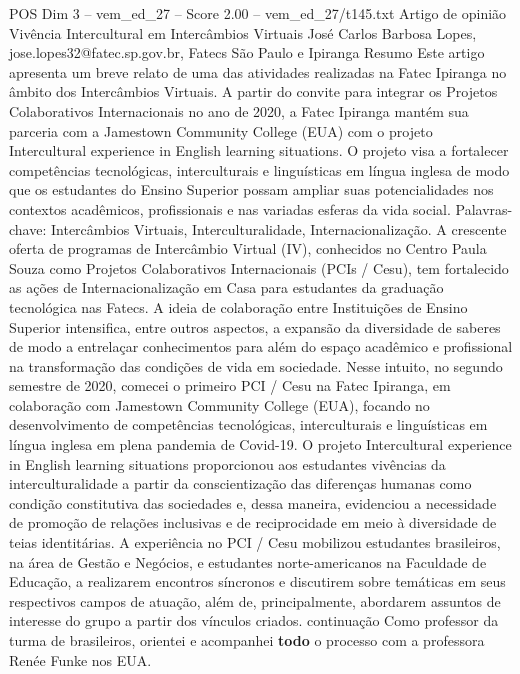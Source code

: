 \begin{textsample}{POS Dim 3 – vem\_ed\_27 – Score 2.00 – vem\_ed\_27/t145.txt}  \label{ex:f3_pos_019}
Artigo de opinião Vivência Intercultural em Intercâmbios Virtuais José Carlos Barbosa Lopes, jose.lopes32@fatec.sp.gov.br, Fatecs São Paulo e Ipiranga Resumo Este artigo apresenta um breve relato de uma das atividades realizadas na Fatec Ipiranga no âmbito dos Intercâmbios Virtuais.
A partir do convite para integrar os Projetos Colaborativos Internacionais no ano de 2020, a Fatec Ipiranga mantém sua parceria com a Jamestown Community College (EUA) com o projeto Intercultural experience in English learning situations.
O projeto visa a fortalecer competências tecnológicas, interculturais e linguísticas em língua inglesa de modo que os estudantes do Ensino Superior possam ampliar suas potencialidades nos contextos acadêmicos, profissionais e nas variadas esferas da vida social.
Palavras-chave: Intercâmbios Virtuais, Interculturalidade, Internacionalização.
A crescente oferta de programas de Intercâmbio Virtual (IV), conhecidos no Centro Paula Souza como Projetos Colaborativos Internacionais (PCIs / Cesu), tem fortalecido as ações de Internacionalização em Casa para estudantes da graduação tecnológica nas Fatecs.
A ideia de colaboração entre Instituições de Ensino Superior intensifica, entre outros aspectos, a expansão da diversidade de saberes de modo a entrelaçar conhecimentos para além do espaço acadêmico e profissional na transformação das condições de vida em sociedade.
Nesse intuito, no segundo semestre de 2020, comecei o primeiro PCI / Cesu na Fatec Ipiranga, em colaboração com Jamestown Community College (EUA), focando no desenvolvimento de competências tecnológicas, interculturais e linguísticas em língua inglesa em plena pandemia de Covid-19.
O projeto Intercultural experience in English learning situations proporcionou aos estudantes vivências da interculturalidade a partir da conscientização das diferenças humanas como condição constitutiva das sociedades e, dessa maneira, evidenciou a necessidade de promoção de relações inclusivas e de reciprocidade em meio à diversidade de teias identitárias.
A experiência no PCI / Cesu mobilizou estudantes brasileiros, na área de Gestão e Negócios, e estudantes norte-americanos na Faculdade de Educação, a realizarem encontros síncronos e discutirem sobre temáticas em seus respectivos campos de atuação, além de, principalmente, abordarem assuntos de interesse do grupo a partir dos vínculos criados. continuação Como professor da turma de brasileiros, orientei e acompanhei \textbf{todo} o processo com a professora Renée Funke nos EUA.

\end{textsample}
